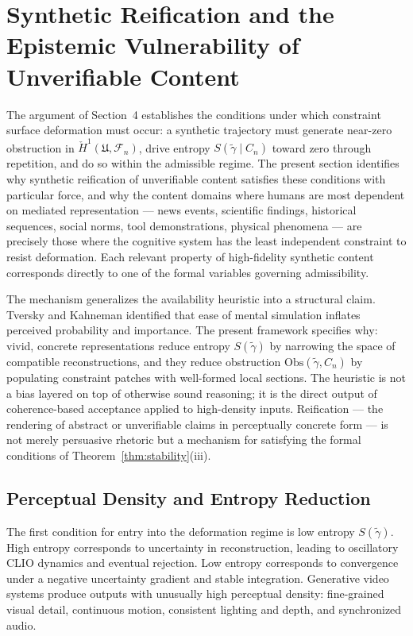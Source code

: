 \documentclass[12pt, a4paper]{article}
\begin{document}
\section{Synthetic Reification and the Epistemic Vulnerability of Unverifiable Content}

The argument of Section~4 establishes the conditions under which constraint surface deformation must occur: a synthetic trajectory must generate near-zero obstruction in $\check{H}^1(\mathfrak{U}, \mathcal{F}_n)$, drive entropy $S(\tilde{\gamma} \mid C_n)$ toward zero through repetition, and do so within the admissible regime. The present section identifies why synthetic reification of unverifiable content satisfies these conditions with particular force, and why the content domains where humans are most dependent on mediated representation --- news events, scientific findings, historical sequences, social norms, tool demonstrations, physical phenomena --- are precisely those where the cognitive system has the least independent constraint to resist deformation. Each relevant property of high-fidelity synthetic content corresponds directly to one of the formal variables governing admissibility.

The mechanism generalizes the availability heuristic into a structural claim. Tversky and Kahneman identified that ease of mental simulation inflates perceived probability and importance. The present framework specifies why: vivid, concrete representations reduce entropy $S(\tilde{\gamma})$ by narrowing the space of compatible reconstructions, and they reduce obstruction $\mathrm{Obs}(\tilde{\gamma}, C_n)$ by populating constraint patches with well-formed local sections. The heuristic is not a bias layered on top of otherwise sound reasoning; it is the direct output of coherence-based acceptance applied to high-density inputs. Reification --- the rendering of abstract or unverifiable claims in perceptually concrete form --- is not merely persuasive rhetoric but a mechanism for satisfying the formal conditions of Theorem~\ref{thm:stability}(iii).

\subsection{Perceptual Density and Entropy Reduction}

The first condition for entry into the deformation regime is low entropy $S(\tilde{\gamma})$. High entropy corresponds to uncertainty in reconstruction, leading to oscillatory CLIO dynamics and eventual rejection. Low entropy corresponds to convergence under a negative uncertainty gradient and stable integration. Generative video systems produce outputs with unusually high perceptual density: fine-grained visual detail, continuous motion, consistent lighting and depth, and synchronized audio.
\end{document}
